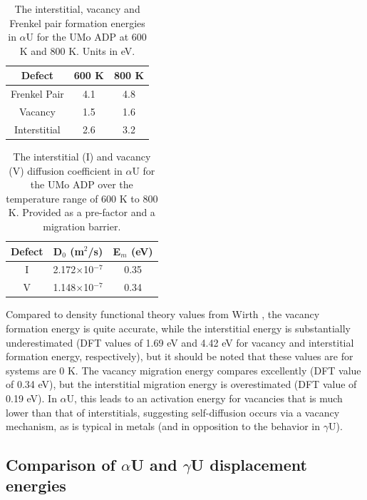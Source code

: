 \documentclass[review]{elsarticle}
\begin{document}
\begin{table}[h]
\caption{The interstitial, vacancy and Frenkel pair formation energies in $\alpha$U for the UMo ADP at 600 K and 800 K. Units in eV.} \label{tab:alphadef}
\begin{center}
\begin{tabular}{|c|c|c|}
	\hline
	Defect & 600 K & 800 K\\
	 \hline
	Frenkel Pair	& 4.1 & 4.8 \\
	Vacancy		& 1.5 & 1.6 \\
	Interstitial		& 2.6 & 3.2 \\
	\hline
\end{tabular}
\end{center}
\label{default}
\end{table}

\begin{table}[h]
\caption{The interstitial (I) and vacancy (V) diffusion coefficient in $\alpha$U for the UMo ADP over the temperature range of 600 K to 800 K. Provided as a pre-factor and a migration barrier.} \label{tab:alphadiff}
\begin{center}
\begin{tabular}{|c|c|c|}
	\hline
	Defect & D$_{0}$ (m$^{2}$/s) & E$_{m}$ (eV)\\
	 \hline
	 I & 2.172$\times$10$^{-7}$ & 0.35 \\
	 V & 1.148$\times$10$^{-7}$ & 0.34 \\
	\hline
\end{tabular}
\end{center}
\label{default}
\end{table}

\FloatBarrier

Compared to density functional theory values from Wirth \cite{wirth2011}, the vacancy formation energy is quite accurate, while the interstitial energy is substantially underestimated (DFT values of 1.69 eV and 4.42 eV for vacancy and interstitial formation energy, respectively), but it should be noted that these values are for systems are 0 K. The vacancy migration energy compares excellently (DFT value of 0.34 eV), but the interstitial migration energy is overestimated (DFT value of 0.19 eV). In $\alpha$U, this leads to an activation energy for vacancies that is much lower than that of interstitials, suggesting self-diffusion occurs via a vacancy mechanism, as is typical in metals (and in opposition to the behavior in $\gamma$U). 

\subsection{Comparison of $\alpha$U and $\gamma$U displacement energies}
\end{document}
